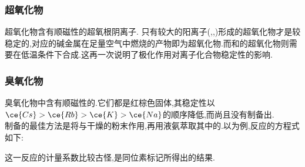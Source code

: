 \documentclass{ctexart}
\begin{document}
\subsubsection{超氧化物}
超氧化物含有顺磁性的超氧根阴离子.%
只有较大的阳离子(,,)形成的超氧化物才是较稳定的,对应的碱金属在足量空气中燃烧的产物即为超氧化物.而和的超氧化物则需要在低温条件下合成.这再一次说明了极化作用对离子化合物稳定性的影响.
\subsubsection{臭氧化物}
臭氧化物中含有顺磁性的.它们都是红棕色固体,其稳定性以$\ce{Cs}>\ce{Rb}>\ce{K}>\ce{Na}$的顺序降低,而尚且没有制备出.\\
\indent 制备的最佳方法是将与干燥的粉末作用,再用液氨萃取其中的.以为例,反应的方程式如下:
\begin{center}
\end{center}
这一反应的计量系数比较古怪,是同位素标记所得出的结果.
\end{document}
